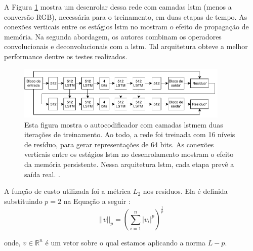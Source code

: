 A Figura \ref{fig:toderici_ae_lstm} mostra um desenrolar dessa rede com camadas \acrshort{lstm} (menos a conversão RGB), necessária para o treinamento, em duas etapas de tempo. As conexões verticais entre os estágios \acrshort{lstm} no mostram o efeito de propagação de memória. 
Na segunda abordagem, os autores combinam os operadores convolucionais e deconvolucionais com a \acrshort{lstm}. Tal arquitetura obteve a melhor performance dentre os testes realizados. %


\begin{figure}[h]
	\centering
	\includegraphics[width=0.90\textwidth]{figuras/ae_lstm.pdf}
	\caption[Autocodificador residual com camadas \acrshort{lstm}]{ Esta figura mostra o autocodificador com camadas  \acrshort{lstm}em duas iterações de treinamento.  Ao todo, a rede foi treinada com 16 níveis de resíduo, para gerar representações de 64 bits. As conexões verticais entre os estágios \acrshort{lstm} no desenrolamento mostram o efeito da memória persistente. Nessa arquitetura \acrshort{lstm}, cada etapa prevê a saída real. \cite{Variable2016Toderici}.}
	\label{fig:toderici_ae_lstm}
\end{figure}


A função de custo utilizada foi a métrica $L_2$ nos resíduos. Ela é definida substituindo $p=2$ na Equação a seguir \cite{nie2010efficient}:
\begin{equation}
||v||_p = \left ( \sum_{i=1}^n |v_i|^p \right)^{\frac{1}{p}}  
\end{equation}

onde, $v \in \mathbb{R}^n$ é um vetor sobre o qual estamos aplicando a norma $L-p$. 



